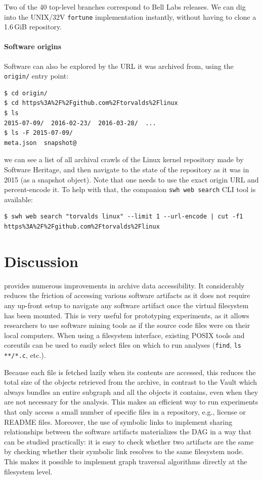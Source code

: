 Two of the 40 top-level branches correspond to Bell Labs releases. We can dig
into the UNIX/32V \texttt{fortune} implementation instantly, without having to
clone a 1.6\,GiB repository.


\paragraph{Software origins}

Software can also be explored by the URL it was archived from, using the
\texttt{origin/} entry point:

\begin{verbatim}
$ cd origin/
$ cd https%3A%2F%2Fgithub.com%2Ftorvalds%2Flinux
$ ls
2015-07-09/  2016-02-23/  2016-03-28/  ...
$ ls -F 2015-07-09/
meta.json  snapshot@
\end{verbatim}

we can see a list of all archival crawls of the Linux kernel repository made by
Software Heritage, and then navigate to the state of the repository as it was
in 2015 (as a snapshot object). Note that one needs to use the exact origin URL
and percent-encode it. To help with that, the companion \texttt{swh web search}
CLI tool is available:

\begin{verbatim}
$ swh web search "torvalds linux" --limit 1 --url-encode | cut -f1
https%3A%2F%2Fgithub.com%2Ftorvalds%2Flinux
\end{verbatim}


\section{Discussion}

\SWHFS{} provides numerous improvements in archive data accessibility.
It considerably reduces the friction of accessing various software artifacts as
it does not require any up-front setup to navigate any software artifact once
the virtual filesystem has been mounted. This is very useful for prototyping
experiments, as it allows researchers to use software mining tools as if the
source code files were on their local computers. When using a filesystem interface,
existing POSIX tools and coreutils can be used to easily select files on which
to run analyses (\texttt{find}, \texttt{ls **/*.c},
etc.).

Because each file is fetched lazily when its contents are accessed, this
reduces the total size of the objects retrieved from the archive, in contrast
to the Vault which always bundles an entire subgraph and all the objects it
contains, even when they are not necessary for the analysis. This makes
\SWHFS{} an efficient way to run experiments that only access a small number of
specific files in a repository, e.g., license or README files.
Moreover, the use of symbolic links to implement sharing relationships between
the software artifacts materializes the DAG in a way that can be studied
practically: it is easy to check whether two artifacts are the same by
checking whether their symbolic link resolves to the same filesystem node. This
makes it possible to implement graph traversal algorithms directly at the
filesystem level.

